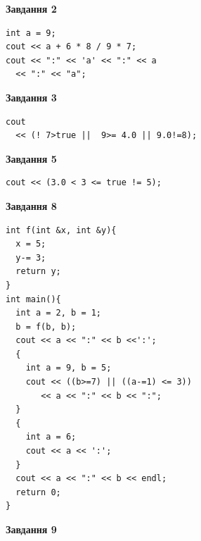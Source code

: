 \documentclass[12pt, ukrainian]{article}
\begin{document}
{\begin {large}
\begin{minipage}[t]{7.0cm}
\end{minipage}
\vline \hspace{1mm}
\begin{minipage}[t]{11.0cm}

\begin{center}
\textbf{Завдання 2}
\end{center}
\vspace{-8mm}

\begin{verbatim}
int a = 9;
cout << a + 6 * 8 / 9 * 7;
cout << ":" << 'a' << ":" << a 
  << ":" << "a";
\end{verbatim}



\begin{center}
\textbf{Завдання 3}
\end{center}
\vspace{-8mm}

\begin{verbatim}
cout 
  << (! 7>true ||  9>= 4.0 || 9.0!=8);
\end{verbatim}



\begin{center}
\textbf{Завдання 5}
\end{center}
\vspace{-8mm}

\begin{verbatim}
cout << (3.0 < 3 <= true != 5);
\end{verbatim}



\begin{center}
\textbf{Завдання 8}
\end{center}
\vspace{-8mm}

\begin{verbatim}
int f(int &x, int &y){
  x = 5;
  y-= 3;
  return y;
}
int main(){
  int a = 2, b = 1;
  b = f(b, b);
  cout << a << ":" << b <<':';
  {
    int a = 9, b = 5;
    cout << ((b>=7) || ((a-=1) <= 3))
       << a << ":" << b << ":";
  }
  {
    int a = 6;
    cout << a << ':';
  }
  cout << a << ":" << b << endl;
  return 0;
}
\end{verbatim}

\end{minipage}


\begin{minipage}[t]{7.0cm}

\begin{center}
\textbf{Завдання 9}
\end{center}
\vspace{-8mm}


\end{minipage}
\end{large}}
\end{document}
